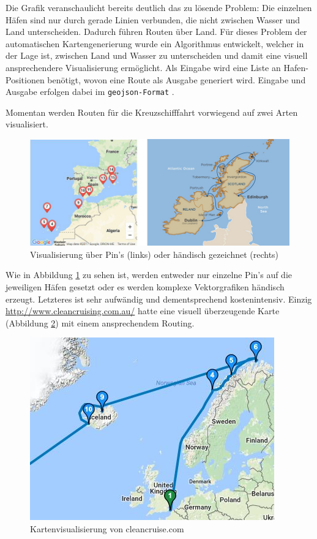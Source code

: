 \documentclass[letterpaper]{article}
\begin{document}
	Die Grafik veranschaulicht bereits deutlich das zu lösende Problem: Die einzelnen Häfen sind nur durch gerade Linien verbunden, die nicht zwischen Wasser und Land unterscheiden. Dadurch führen Routen über Land. Für dieses Problem der automatischen Kartengenerierung wurde ein Algorithmus entwickelt, welcher in der Lage ist, zwischen Land und Wasser zu unterscheiden und damit eine visuell ansprechendere Visualisierung ermöglicht. Als Eingabe wird eine Liste an Hafen-Positionen benötigt, wovon eine Route als Ausgabe generiert wird. Eingabe und Ausgabe erfolgen dabei im \texttt{geojson-Format} \cite{rfc7946}.

	Momentan werden Routen für die Kreuzschifffahrt vorwiegend auf zwei Arten visualisiert.

	\begin{figure}[!htb]
		\begin{center}
		\includegraphics[width=\linewidth]{state_of_the_art}
		\caption{Visualisierung über Pin's (links) oder händisch gezeichnet (rechts)}
		\label{fig:state of the art}
		\end{center}
	\end{figure}

	Wie in Abbildung \ref{fig:state of the art} zu sehen ist, werden entweder nur einzelne Pin's auf die jeweiligen Häfen gesetzt oder es werden komplexe Vektorgrafiken händisch erzeugt. Letzteres ist sehr aufwändig und dementsprechend kostenintensiv. Einzig \url{http://www.cleancruising.com.au/} hatte eine visuell überzeugende Karte (Abbildung \ref{fig:state of the art cleancruise}) mit einem ansprechendem Routing. 

	\begin{figure}[!htb]
		\begin{center}
		\includegraphics[width=.6\linewidth]{state_of_the_art_cleancruise}
		\caption{Kartenvisualisierung von cleancruise.com}
		\label{fig:state of the art cleancruise}
		\end{center}
	\end{figure}
\end{document}
